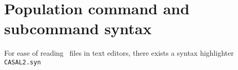 \section{Population command and subcommand syntax\label{sec:population-syntax}}
For ease of reading \CNAME\ files in text editors, there exists a syntax highlighter \texttt{CASAL2.syn}
\subsection{}
 

\subsection{}
 

\subsection{}
 

\subsection{}
 

\subsection{}
 

\subsection{}


\subsection{}
 

\subsection{}
 

\subsection{}


